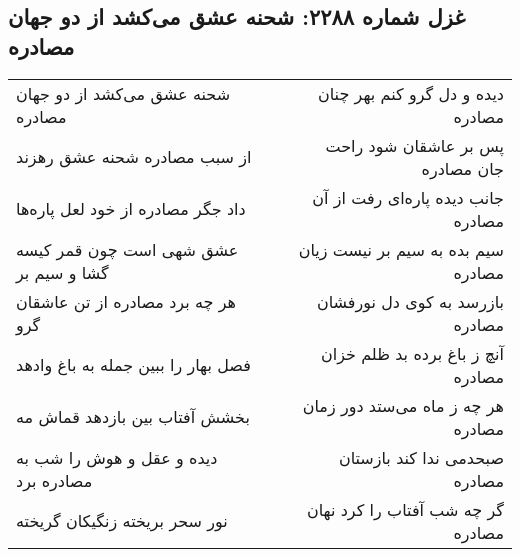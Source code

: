 \begin{center}
\section*{غزل شماره ۲۲۸۸: شحنه عشق می‌کشد از دو جهان مصادره}
\label{sec:2288}
\begin{longtable}{l p{0.5cm} r}
شحنه عشق می‌کشد از دو جهان مصادره
&&
دیده و دل گرو کنم بهر چنان مصادره
\\
از سبب مصادره شحنه عشق رهزند
&&
پس بر عاشقان شود راحت جان مصادره
\\
داد جگر مصادره از خود لعل پاره‌ها
&&
جانب دیده پاره‌ای رفت از آن مصادره
\\
عشق شهی است چون قمر کیسه گشا و سیم بر
&&
سیم بده به سیم بر نیست زیان مصادره
\\
هر چه برد مصادره از تن عاشقان گرو
&&
بازرسد به کوی دل نورفشان مصادره
\\
فصل بهار را ببین جمله به باغ وادهد
&&
آنچ ز باغ برده بد ظلم خزان مصادره
\\
بخشش آفتاب بین بازدهد قماش مه
&&
هر چه ز ماه می‌ستد دور زمان مصادره
\\
دیده و عقل و هوش را شب به مصادره برد
&&
صبحدمی ندا کند بازستان مصادره
\\
نور سحر بریخته زنگیکان گریخته
&&
گر چه شب آفتاب را کرد نهان مصادره
\\
\end{longtable}
\end{center}
